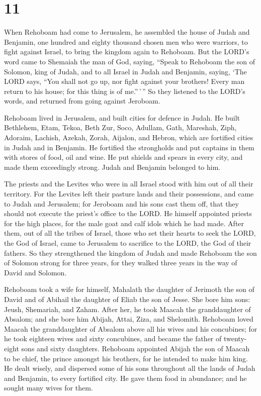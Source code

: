 \hypertarget{section-10}{%
\section{11}\label{section-10}}

 When Rehoboam had come to Jerusalem, he assembled the
house of Judah and Benjamin, one hundred and eighty thousand chosen men
who were warriors, to fight against Israel, to bring the kingdom again
to Rehoboam.  But the LORD's word came to Shemaiah the man
of God, saying,  ``Speak to Rehoboam the son of Solomon,
king of Judah, and to all Israel in Judah and Benjamin, saying,
 `The LORD says, ``You shall not go up, nor fight against
your brothers! Every man return to his house; for this thing is of
me.''\,'\,'' So they listened to the LORD's words, and returned from
going against Jeroboam.

 Rehoboam lived in Jerusalem, and built cities for defence
in Judah.  He built Bethlehem, Etam, Tekoa, 
Beth Zur, Soco, Adullam,  Gath, Mareshah, Ziph,
 Adoraim, Lachish, Azekah,  Zorah, Aijalon,
and Hebron, which are fortified cities in Judah and in Benjamin.
 He fortified the strongholds and put captains in them
with stores of food, oil and wine.  He put shields and
spears in every city, and made them exceedingly strong. Judah and
Benjamin belonged to him.

 The priests and the Levites who were in all Israel stood
with him out of all their territory.  For the Levites
left their pasture lands and their possessions, and came to Judah and
Jerusalem; for Jeroboam and his sons cast them off, that they should not
execute the priest's office to the LORD.  He himself
appointed priests for the high places, for the male goat and calf idols
which he had made.  After them, out of all the tribes of
Israel, those who set their hearts to seek the LORD, the God of Israel,
came to Jerusalem to sacrifice to the LORD, the God of their fathers.
 So they strengthened the kingdom of Judah and made
Rehoboam the son of Solomon strong for three years, for they walked
three years in the way of David and Solomon.

 Rehoboam took a wife for himself, Mahalath the daughter
of Jerimoth the son of David and of Abihail the daughter of Eliab the
son of Jesse.  She bore him sons: Jeush, Shemariah, and
Zaham.  After her, he took Maacah the granddaughter of
Absalom; and she bore him Abijah, Attai, Ziza, and Shelomith.
 Rehoboam loved Maacah the granddaughter of Absalom above
all his wives and his concubines; for he took eighteen wives and sixty
concubines, and became the father of twenty-eight sons and sixty
daughters.  Rehoboam appointed Abijah the son of Maacah
to be chief, the prince amongst his brothers, for he intended to make
him king.  He dealt wisely, and dispersed some of his
sons throughout all the lands of Judah and Benjamin, to every fortified
city. He gave them food in abundance; and he sought many wives for them.

